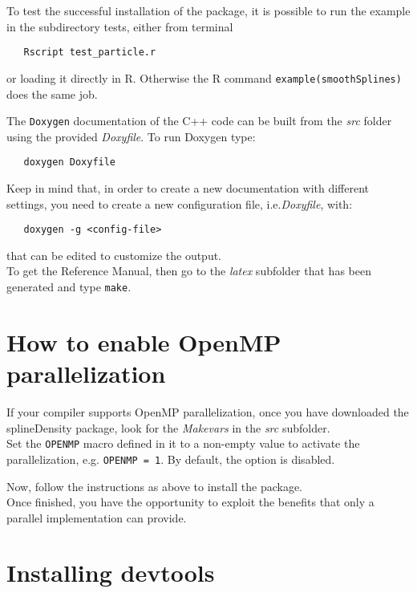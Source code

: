 To test the successful installation of the package, it is possible to run the example in the subdirectory tests, either from terminal
\begin{verbatim}
   Rscript test_particle.r
\end{verbatim}
or loading it directly in R. Otherwise the R command \verb|example(smoothSplines)| does the same job.

The \verb|Doxygen| documentation of the C++ code can be built from the \textit{src} folder using the provided \textit{Doxyfile}. To run Doxygen type:
\begin{verbatim}
   doxygen Doxyfile
\end{verbatim}
Keep in mind that, in order to create a new documentation with different settings, you need to create a new configuration file, i.e.\textit{Doxyfile}, with:
\begin{verbatim}
   doxygen -g <config-file>
\end{verbatim}
that can be edited to customize the output. \\

To get the Reference Manual, then go to the \textit{latex} subfolder that has been generated and type \verb|make|.




\section{How to enable OpenMP parallelization}
If your compiler supports OpenMP parallelization, once you have downloaded the splineDensity package, look for the \textit{Makevars} in the \textit{src} subfolder.\\
Set the \verb|OPENMP| macro defined in it to a non-empty value to activate the parallelization, e.g. \verb|OPENMP = 1|. By default, the option is disabled.

Now, follow the instructions as above to install the package. \\
Once finished, you have the opportunity to exploit the benefits that only a parallel implementation can provide.


\section{Installing devtools}

